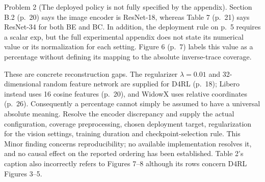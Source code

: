 \documentclass[10pt]{article}
\begin{document}
Problem 2 (The deployed policy is not fully specified by the appendix).  Section B.2 (p. 20) says the image encoder is ResNet-18, whereas Table 7 (p. 21) says ResNet-34 for both BE and BC. In addition, the deployment rule on p. 5 requires a scalar \(\mathrm{exp}\), but the full experimental appendix does not state its numerical value or its normalization for each setting. Figure 6 (p. 7) labels this value as a percentage without defining its mapping to the absolute inverse-trace coverage.\par
These are concrete reconstruction gaps. The regularizer \(\lambda=0.01\) and 32-dimensional random feature network are supplied for D4RL (p. 18); Libero instead uses 16 cosine features (p. 20), and WidowX uses relative coordinates (p. 26). Consequently a percentage cannot simply be assumed to have a universal absolute meaning. Resolve the encoder discrepancy and supply the actual configuration, coverage preprocessing, chosen deployment target, regularization for the vision settings, training duration and checkpoint-selection rule. This Minor finding concerns reproducibility; no available implementation resolves it, and no causal effect on the reported ordering has been established. Table 2’s caption also incorrectly refers to Figures 7–8 although its rows concern D4RL Figures 3–5.\par
\end{document}
